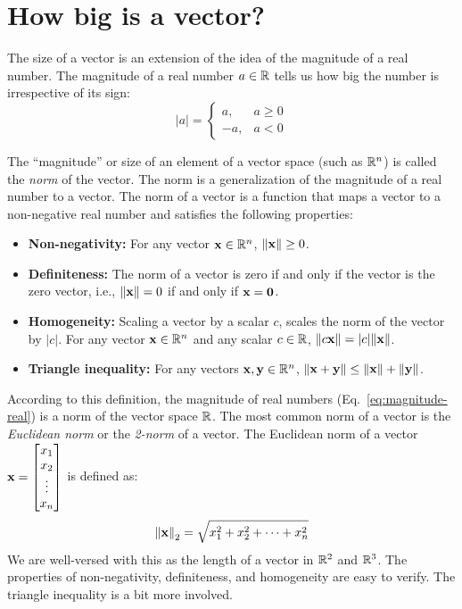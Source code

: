 \section{How big is a vector?}
The size of a vector is an extension of the idea of the magnitude of a real number. The magnitude of a real number $a \in \mathbb{R}$ tells us how big the number is irrespective of its sign:
\begin{equation}
    \vert a \vert = \begin{cases} a, & a \geq 0 \\ -a, & a < 0 \end{cases}
    \label{eq:magnitude-real}
\end{equation}

The ``magnitude'' or size of an element of a vector space (such as $\mathbb{R}^n$) is called the \textit{norm} of the vector. The norm is a generalization of the magnitude of a real number to a vector. The norm of a vector is a function that maps a vector to a non-negative real number and satisfies the following properties:
\begin{itemize}
    \item \textbf{Non-negativity:} For any vector $\mathbf{x} \in \mathbb{R}^n$, $\norm{\mathbf{x}} \geq 0$.
    \item \textbf{Definiteness:} The norm of a vector is zero if and only if the vector is the zero vector, i.e., $\norm{\mathbf{x}} = 0$ if and only if $\mathbf{x} = \mathbf{0}$.
    \item \textbf{Homogeneity:} Scaling a vector by a scalar $c$, scales the norm of the vector by $\vert c \vert$. For any vector $\mathbf{x} \in \mathbb{R}^n$ and any scalar $c \in \mathbb{R}$, $\norm{c\mathbf{x}} = \vert c \vert \norm{\mathbf{x}}$.
    \item \textbf{Triangle inequality:} For any vectors $\mathbf{x}, \mathbf{y} \in \mathbb{R}^n$, $\norm{\mathbf{x} + \mathbf{y}} \leq \norm{\mathbf{x}} + \norm{\mathbf{y}}$.
\end{itemize}
According to this definition, the magnitude of real numbers (Eq.~\ref{eq:magnitude-real}) is a norm of the vector space $\mathbb{R}$. The most common norm of a vector is the \textit{Euclidean norm} or the \textit{2-norm} of a vector. The Euclidean norm of a vector $\mf{x} = \bmxc x_1 \\ x_2 \\ \vdots \\ x_n \emx$ is defined as:
\begin{equation}
    \norm{\mathbf{x}}_2 = \sqrt{x_1^2 + x_2^2 + \cdots + x_n^2}
    \label{eq:euclidean-norm}
\end{equation}
We are well-versed with this as the length of a vector in $\mathbb{R}^2$ and $\mathbb{R}^3$. The properties of non-negativity, definiteness, and homogeneity are easy to verify. The triangle inequality is a bit more involved.

